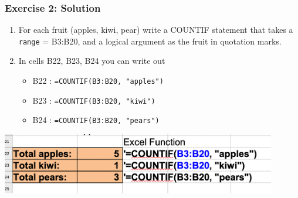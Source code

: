 \documentclass[12pt]{beamer}
\begin{document}
\begin{frame}
	\frametitle{Exercise 2: Solution}
	\begin{enumerate}
		\item For each fruit (apples, kiwi, pear) write a COUNTIF statement that takes a \texttt{range} = B3:B20,
		and a logical argument as the fruit in quotation marks.
		\item In cells B22, B23, B24 you can write out 
			\begin{itemize}
				\item B22 : \texttt{=COUNTIF(B3:B20, "apples")}
				\item B23 : \texttt{=COUNTIF(B3:B20, "kiwi")}
				\item B24 : \texttt{=COUNTIF(B3:B20, "pears")}
			\end{itemize}
	\end{enumerate}
	\begin{center}
		\includegraphics[width = 0.9\textwidth ]{FruitsReduxRevival.png}
	\end{center}
\end{frame}
\end{document}

